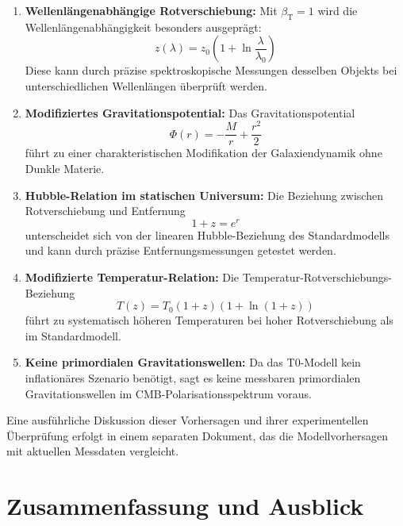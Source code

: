 \documentclass[12pt,a4paper]{article}
\newcommand{\betaT}{\beta_{\text{T}}}
\begin{document}
	\begin{enumerate}
		\item \textbf{Wellenlängenabhängige Rotverschiebung:} Mit \(\betaT = 1\) wird die Wellenlängenabhängigkeit besonders ausgeprägt:
		\begin{equation}
			z(\lambda) = z_0 \left(1 + \ln \frac{\lambda}{\lambda_0}\right)
		\end{equation}
		Diese kann durch präzise spektroskopische Messungen desselben Objekts bei unterschiedlichen Wellenlängen überprüft werden.
		
		\item \textbf{Modifiziertes Gravitationspotential:} Das Gravitationspotential 
		\begin{equation}
			\Phi(r) = -\frac{M}{r} + \frac{r^2}{2}
		\end{equation}
		führt zu einer charakteristischen Modifikation der Galaxiendynamik ohne Dunkle Materie.
		
		\item \textbf{Hubble-Relation im statischen Universum:} Die Beziehung zwischen Rotverschiebung und Entfernung
		\begin{equation}
			1 + z = e^{r}
		\end{equation}
		unterscheidet sich von der linearen Hubble-Beziehung des Standardmodells und kann durch präzise Entfernungsmessungen getestet werden.
		
		\item \textbf{Modifizierte Temperatur-Relation:} Die Temperatur-Rotverschiebungs-Beziehung
		\begin{equation}
			T(z) = T_0 (1+z)(1 + \ln(1+z))
		\end{equation}
		führt zu systematisch höheren Temperaturen bei hoher Rotverschiebung als im Standardmodell.
		
		\item \textbf{Keine primordialen Gravitationswellen:} Da das T0-Modell kein inflationäres Szenario benötigt, sagt es keine messbaren primordialen Gravitationswellen im CMB-Polarisationsspektrum voraus.
	\end{enumerate}
	
	Eine ausführliche Diskussion dieser Vorhersagen und ihrer experimentellen Überprüfung erfolgt in einem separaten Dokument, das die Modellvorhersagen mit aktuellen Messdaten vergleicht.
	
	\section{Zusammenfassung und Ausblick}
	
\end{document}
